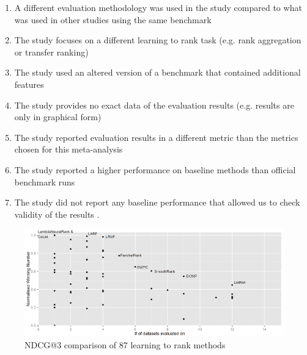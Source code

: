 \documentclass{sig-alternate}
\begin{document}
\begin{enumerate}
\item A different evaluation methodology was used in the study compared to what was used in other studies using the same benchmark \cite{Geng2011, Lin2012}
\item The study focuses on a different learning to rank task (e.g. rank aggregation or transfer ranking) \cite{De2011, De2010, Derhami2013, De2012, Chen2010, Ah-Pine2008, Wang2009c, De2013, Miao2013, Hoi2008, De2012b, Duh2011b, Argentini2012, Qin2010c, Volkovs2013, Desarkar2011, Pan2013, Lin2011b, Volkovs2012, Dammak2011}
\item The study used an altered version of a benchmark that contained additional features \cite{Bidoki2009, Ding2010}
\item The study provides no exact data of the evaluation results (e.g. results are only in graphical form) \cite{Wang2008, Wang2010, Xu2010, Kuo2009, Li2008, Xia2008, Zhou2011, Wu2011, Zhu2009, Karimzadehgan2011, Swersky2012, Pan2011, Ni2008, Ciaramita2008, Stewart2012, Petterson2009, Agarwal2010, Chang2009, Qin2008c, Adams2011, Sculley2009, Huang2008, Alejo2010, Sun2011, He2010b, Benbouzid2012, Geng2012, Chen2012, Xu2012, Shivaswamy2011}
\item The study reported evaluation results in a different metric than the metrics chosen for this meta-analysis \cite{Yu2009, Thuy2009, Pahikkala2009, Kersting2009, Mohan2011}
\item The study reported a higher performance on baseline methods than official benchmark runs \cite{Dubey2009, Banerjee2009, Peng2010b, Song2014, Bian2010, Bian2010b, Carvalho2008, Acharyya2012, Peng2010b, Tran2012, Asadi2013c}
\item The study did not report any baseline performance that allowed us to check validity of the results \cite{Chakrabarti2008, Wang2012b, Buffoni2011}.
\end{enumerate}

\begin{figure}
\centering
\includegraphics[scale=0.19]{gfx/ndcg3_winnum}
\caption{NDCG@3 comparison of 87 learning to rank methods}
\label{fig:normalized_winning_number_ndcg3}
\end{figure}
\end{document}
